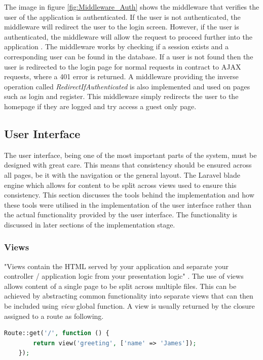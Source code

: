 The image in figure \ref{fig:Middleware_Auth} shows the middleware that verifies the user of the application is authenticated. If the user is not authenticated, the middleware will redirect the user to the login screen. However, if the user is authenticated, the middleware will allow the request to proceed further into the application \cite{Laravel:Middleware}. The middleware works by checking if a session exists and a corresponding user can be found in the database. If a user is not found then the user is redirected to the login page for normal requests in contract to AJAX requests, where a 401 error is returned. A middleware providing the inverse operation called \emph{RedirectIfAuthenticated} is also implemented and used on pages such as login and register. This middleware simply redirects the user to the homepage if they are logged and try access a guest only page. 

\subsection{User Interface}
The user interface, being one of the most important parts of the system, must be designed with great care. This means that consistency should be ensured across all pages, be it with the navigation or the general layout. The Laravel blade engine which allows for content to be split across views used to ensure this consistency. This section discusses the tools behind the implementation and how these tools were utilised in the implementation of the user interface rather than the actual functionality provided by the user interface. The functionality is discussed in later sections of the implementation stage.

\subsubsection{Views}
"Views contain the HTML served by your application and separate your controller / application logic from your presentation logic" \cite{Laravel:Views}. The use of views allows content of a single page to be split across multiple files. This can be achieved by abstracting common functionality into separate views that can then be included using \emph{view} global function. A view is usually returned by the closure assigned to a route as following.

\begin{lstlisting}[language=php]
	Route::get('/', function () {
		return view('greeting', ['name' => 'James']);
	});
\end{lstlisting}

